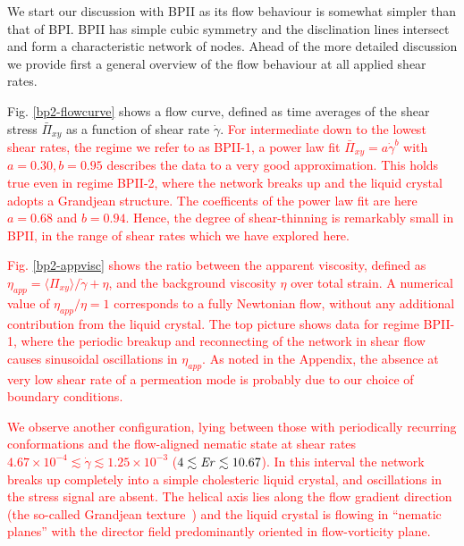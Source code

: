 \documentclass[8.5pt,twoside,twocolumn]{article}
\newcommand{\e}[1]{\times10^{#1}}
\newcommand{\gd}{\dot{\gamma}}
\newcommand{\rev}[1]{{\textcolor{red}{#1}}}
\begin{document}
We start our discussion with BPII as its flow behaviour is somewhat simpler 
than that of BPI. BPII has simple cubic symmetry and the disclination lines 
intersect and form a characteristic network of nodes.
Ahead of the more detailed discussion we provide first a general overview of the 
flow behaviour at all applied shear rates.

Fig. \ref{bp2-flowcurve} shows a flow curve, defined as time averages of 
the shear stress $\bar{\Pi}_{xy}$ as a function of shear rate $\gd$.
\rev{For intermediate down to the lowest shear rates, the regime we refer to as BPII-1, a 
power law fit $\bar{\Pi}_{xy}=a \gd^b$ with $a=0.30, b=0.95$ describes 
the data to a very good approximation.
This holds true even in regime BPII-2, where the network breaks up and 
the liquid crystal adopts a Grandjean structure. The coefficents of the power law fit are
here $a=0.68$ and $b=0.94$. Hence, the degree of shear-thinning is 
remarkably small in BPII, in the range of shear rates which we have explored here.}

\rev{
Fig. \ref{bp2-appvisc} shows the ratio between the apparent viscosity, 
defined as $\eta_{app}=\langle \Pi_{xy} \rangle/\gd +\eta$, and the background viscosity $\eta$ 
over total strain.
A numerical value of $\eta_{app}/\eta=1$ corresponds to a fully Newtonian flow,
without any additional contribution from the liquid crystal.
The top picture shows data for regime BPII-1, where the periodic breakup and reconnecting of the network 
in shear flow causes sinusoidal oscillations in $\eta_{app}$. As noted in the Appendix, the
absence at very low shear rate of a permeation mode is probably due to our
choice of boundary conditions.
}


\rev{
We observe another configuration, lying between those with periodically recurring conformations 
and the flow-aligned nematic state at shear rates $4.67\e{-4}\lesssim\gd\lesssim1.25\e{-3}$ ($4 \lesssim {\it Er} \lesssim 10.67$). 
In this interval the network breaks up completely into a simple cholesteric liquid crystal, and oscillations in the stress signal are absent.
The helical axis lies along the flow gradient direction (the so-called Grandjean texture~\cite{deGennes})
and the liquid crystal is flowing in ``nematic planes'' with the director field predominantly oriented in flow-vorticity plane.
}
\end{document}
